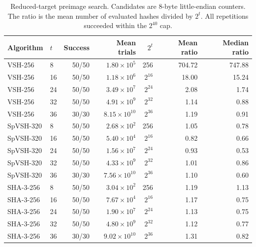 \begin{table}[ht]
\caption{Reduced-target preimage search. Candidates are 8-byte little-endian counters. The ratio is the mean number of evaluated hashes divided by \(2^{t}\). All repetitions succeeded within the \(2^{40}\) cap.}
\label{tab:preimage_run01}
\centering
\small
\begin{tabular}{@{}llrrrrr@{}}
\toprule
Algorithm & \(t\) & Success & Mean trials & \(2^{t}\) & Mean ratio & Median ratio \\
\midrule
VSH-256 & 8 & 50/50 & \(1.80\times 10^{5}\) & 256 & 704.72 & 747.88 \\
VSH-256 & 16 & 50/50 & \(1.18\times 10^{6}\) & \(2^{16}\) & 18.00 & 15.24 \\
VSH-256 & 24 & 50/50 & \(3.49\times 10^{7}\) & \(2^{24}\) & 2.08 & 1.74 \\
VSH-256 & 32 & 50/50 & \(4.91\times 10^{9}\) & \(2^{32}\) & 1.14 & 0.88 \\
VSH-256 & 36 & 30/30 & \(8.15\times 10^{10}\) & \(2^{36}\) & 1.19 & 0.91 \\
\midrule
SpVSH-320 & 8 & 50/50 & \(2.68\times 10^{2}\) & 256 & 1.05 & 0.78 \\
SpVSH-320 & 16 & 50/50 & \(5.40\times 10^{4}\) & \(2^{16}\) & 0.82 & 0.66 \\
SpVSH-320 & 24 & 50/50 & \(1.56\times 10^{7}\) & \(2^{24}\) & 0.93 & 0.53 \\
SpVSH-320 & 32 & 50/50 & \(4.33\times 10^{9}\) & \(2^{32}\) & 1.01 & 0.86 \\
SpVSH-320 & 36 & 30/30 & \(7.56\times 10^{10}\) & \(2^{36}\) & 1.10 & 0.60 \\
\midrule
SHA-3-256 & 8 & 50/50 & \(3.04\times 10^{2}\) & 256 & 1.19 & 1.13 \\
SHA-3-256 & 16 & 50/50 & \(7.67\times 10^{4}\) & \(2^{16}\) & 1.17 & 0.75 \\
SHA-3-256 & 24 & 50/50 & \(1.90\times 10^{7}\) & \(2^{24}\) & 1.13 & 0.75 \\
SHA-3-256 & 32 & 50/50 & \(4.80\times 10^{9}\) & \(2^{32}\) & 1.12 & 0.77 \\
SHA-3-256 & 36 & 30/30 & \(9.02\times 10^{10}\) & \(2^{36}\) & 1.31 & 0.82 \\
\bottomrule
\end{tabular}
\end{table}
